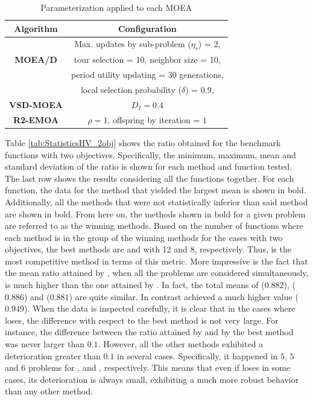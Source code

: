%
\begin{table}[t]
\centering
\caption{ Parameterization applied to each MOEA}
\label{tab:Parametrization}
\begin{tabular}{c|c}
\hline
\textbf{Algorithm} & \textbf{Configuration} \\ \hline
\multirow{3}{*}{\textbf{MOEA/D}} &Max. updates by sub-problem ($\eta_r$) = 2, \\
 & tour selection = 10,   neighbor size = 10, \\
 & period utility updating = 30 generations, \\ 
 & local selection probability ($\delta$) = 0.9,\\ \hline
\textbf{VSD-MOEA} & $D_I=0.4$ \\ \hline
\textbf{R2-EMOA} & $\rho=1$, offspring by iteration = $1$ \\ \hline
\end{tabular}
\end{table}







Table \ref{tab:StatisticsHV_2obj} shows the \HV{} ratio obtained for the benchmark functions
with two objectives.
%
Specifically, the minimum, maximum, mean and standard deviation of the \HV{} ratio is shown for each method and function tested.
%
The last row shows the results considering all the functions together.
%
For each function, the data for the method that yielded the largest mean is shown in bold.
%
Additionally, all the methods that were not statistically inferior than said method are shown in bold.
%
From here on, the methods shown in bold for a given problem are referred to as the winning methods.
%
Based on the number of functions where each method is in the group of the winning methods for the cases 
with two objectives, the best methods are \VSDMOEA{} and \RMOEA{} with 12 and 8, respectively.
%
Thus, \VSDMOEA{} is the most competitive method in terms of this metric.
%
More impressive is the fact that the mean \HV{} ratio attained by \VSDMOEA{}, when all the problems are considered simultaneously, is much higher
than the one attained by \RMOEA{}.
%
In fact, the total means of \RMOEA{} ($0.882$), \NSGAII{} ($0.886$) and \MOEAD{} ($0.881$) are quite similar.
%
In contrast \VSDMOEA{} achieved a much higher value ($0.949$).
%
When the data is inspected carefully, it is clear that in the cases where \VSDMOEA{} loses, the difference with respect to the
best method is not very large.
%
For instance, the difference between the \HV{} ratio attained by \VSDMOEA{} and by the best method was never larger
than $0.1$.
%
However, all the other methods exhibited a deterioration greater than $0.1$ in several cases.
%
Specifically, it happened in $5$, $5$ and $6$ problems for \RMOEA{}, \NSGAII{} and \MOEAD{}, respectively.
%
This means that even if \VSDMOEA{} loses in some cases, its deterioration is always small, exhibiting a much more 
robust behavior than any other method.

